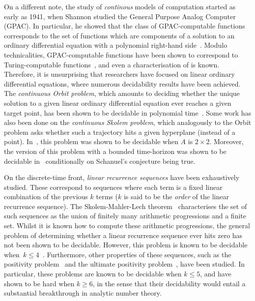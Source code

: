 On a different note, the study of \emph{continous} models of computation started as early as 1941, when Shannon studied the General Purpose Analog Computer (GPAC).
In particular, he showed that the class of GPAC-computable functions corresponds to the set of functions which are components of a solution to an ordinary differential equation with a polynomial right-hand side~\cite{Shannon1941}.
Modulo technicalities, GPAC-computable functions have been shown to correspond to Turing-computable functions~\cite{Bournez1,Bournez2}, and even a characterisation of \PTIME{} is known.
Therefore, it is unsurprising that researchers have focused on linear ordinary differential equations, where numerous decidability results have been achieved.
The \emph{continuous Orbit problem}, which amounts to deciding whether the unique solution to a given linear ordinary differential equation ever reaches a given target point, has been shown to be decidable in polynomial time~\cite{Hainry08,ContinuousOrbitIPL}.
Some work has also been done on the \emph{continuous Skolem problem}, which analogously to the Orbit problem asks whether such a trajectory hits a given hyperplane (instead of a point).
In~\cite{ContinuousSkolem}, this problem was shown to be decidable when $A$ is $2 \times 2$.
Moreover, the version of this problem with a bounded time-horizon was shown to be decidable in~\cite{ContinuousSkolem3} conditionally on Schanuel's conjecture being true.

On the discrete-time front, \emph{linear recurrence sequences} have been exhaustively studied. These correspond to sequences where each term is a fixed linear combination of the previous $k$ terms ($k$ is said to be the \emph{order} of the linear recurrence sequence). The Skolem-Mahler-Lech theorem~\cite{Sko34,Mah35,Lec53,Hansel85} characterises the set of such sequences as the union of finitely many arithmetic progressions and a finite set. Whilst it is known how to compute these arithmetic progressions\cite{BM76}, the general problem of determining whether a linear recurrence sequence ever hits zero has not been shown to be decidable. However, this problem is known to be decidable when~$k \leq 4$~\cite{Ver85}.
Furthermore, other properties of these sequences, such as the positivity problem~\cite{BG07,HHH06,LT09,OW13:constructive-positivity,OW14:SODA,Liu10} and the ultimate positivity problem~\cite{OuaknineW13b}, have been studied.
In particular, these problems are known to be decidable when $k \leq 5$, and have shown to be hard when $k \geq 6$, in the sense that their decidability would entail a substantial breakthrough in analytic number theory.

